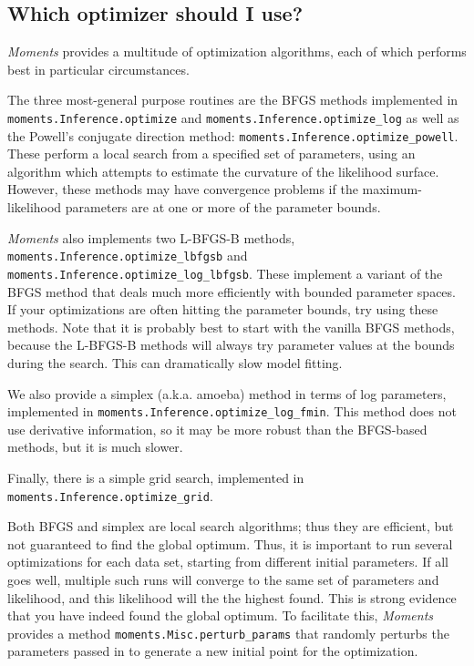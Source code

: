 \documentclass[12pt]{article}
\makeatletter
\newcommand{\py}[1]{\lstinline[breaklines=true,language=Python, showstringspaces=False]@#1@}
\makeatother
\begin{document}
\subsection{Which optimizer should I use?}\label{sec:which_optimizer}

\textit{Moments} provides a multitude of optimization algorithms, each of which performs best in particular circumstances.

The three most-general purpose routines are the BFGS methods implemented in \py{moments.Inference.optimize} and \py{moments.Inference.optimize_log} as well as the Powell's conjugate direction method: \py{moments.Inference.optimize_powell}.
These perform a local search from a specified set of parameters, using an algorithm which attempts to estimate the curvature of the likelihood surface.
However, these methods may have convergence problems if the maximum-likelihood parameters are at one or more of the parameter bounds.

\textit{Moments} also implements two L-BFGS-B methods, \py{moments.Inference.optimize_lbfgsb} and \py{moments.Inference.optimize_log_lbfgsb}.
These implement a variant of the BFGS method that deals much more efficiently with bounded parameter spaces.
If your optimizations are often hitting the parameter bounds, try using these methods.
Note that it is probably best to start with the vanilla BFGS methods, because the L-BFGS-B methods will always try parameter values at the bounds during the search.
This can dramatically slow model fitting.

We also provide a simplex (a.k.a. amoeba) method in terms of log parameters, implemented in \py{moments.Inference.optimize_log_fmin}.
This method does not use derivative information, so it may be more robust than the BFGS-based methods, but it is much slower.

Finally, there is a simple grid search, implemented in \py{moments.Inference.optimize_grid}.

Both BFGS and simplex are local search algorithms; thus they are efficient, but not guaranteed to find the global optimum.
Thus, it is important to run several optimizations for each data set, starting from different initial parameters.
If all goes well, multiple such runs will converge to the same set of parameters and likelihood, and this likelihood will the the highest found.
This is strong evidence that you have indeed found the global optimum.
To facilitate this, \textit{Moments} provides a method \py{moments.Misc.perturb_params} that randomly perturbs the parameters passed in to generate a new initial point for the optimization.
\end{document}
